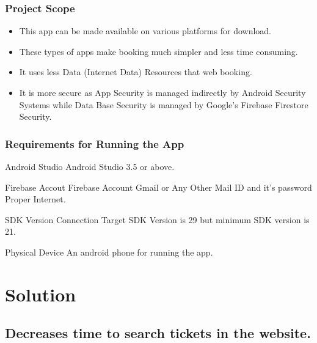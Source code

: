 \documentclass[8pt]{beamer}
\begin{document}

\begin{frame}
\frametitle{Project Scope}
\begin{itemize}
\item This app can be made available on various platforms for download.
\item These types of apps make booking much simpler and less time consuming.
\item  It uses less Data (Internet Data) Resources that web booking.
\item  It is more secure as App Security is managed indirectly by Android Security Systems while Data Base Security is managed by Google's Firebase Firestore Security.
\end{itemize}
\end{frame}

\begin{frame}
\frametitle{Requirements for Running the App}
\begin{block}{Android Studio}
 Android Studio 3.5 or above.
 \end{block}

\begin{block}{Firebase Accout}
Firebase Account Gmail or Any Other Mail ID and it's password Proper Internet.\end{block}

\begin{block}{SDK Version}
Connection Target SDK Version is 29 but minimum SDK version is 21.\end{block}

\begin{block}{Physical Device}
An android phone for running the app.

\end{block}
\end{frame}

\section{Solution} %

\subsection{Decreases time to search tickets in the website.}
\end{document}
